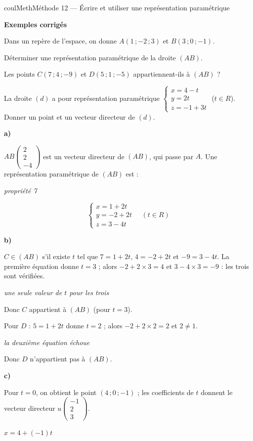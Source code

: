 \documentclass[11pt,a4paper]{article}
\makeatletter
\newcommand{\R}{\mathbb{R}}
\newcommand{\N}{\mathbb{N}}
\newcommand{\Z}{\mathbb{Z}}
\newcommand{\Q}{\mathbb{Q}}
\newcommand{\vect}[1]{\overrightarrow{#1}}
\newcommand{\fois}[1]{\times{\color{coulExo}#1}}
\providecommand{\Cf}{\mathcal{C}\sb{f}}%
\providecommand{\Cg}{\mathcal{C}\sb{g}}%
\newcounter{lycee@signet}
\newcommand{\signet}[3][]{\stepcounter{lycee@signet}%
  \edef\lycee@dest{\if\relax\detokenize{#1}\relax
    signet.\arabic{lycee@signet}\else#1\fi}%
  \hypertarget{\lycee@dest}{}\bookmark[level=#2,dest=\lycee@dest]{#3}}
\def\R{R}\def\N{N}\def\Z{Z}\def\Q{Q}\def\vect#1{#1}\def\Cf{Cf}\def\Cg{Cg}\def\fois#1{×#1}%
\newcommand{\res}[1]{#1}
\newcounter{methode}
\newenvironment{methodebox}[1][Méthode]{\stepcounter{methode}%
  \begin{boitecours}[phantom={\signet[methode-\arabic{methode}]{2}{#1}}]{coulMeth}{#1}}%
  {\end{boitecours}}
\newcommand{\etape}[1]{\par\smallskip\textbf{\color{coulMeth}#1}\par\nobreak\smallskip}
\newcommand{\explique}[2]{\par\smallskip\noindent
  \begin{minipage}[t]{0.57\linewidth}\raggedright #1\end{minipage}\hfill
  \begin{minipage}[t]{0.40\linewidth}\raggedright\leavevmode
    {\small\itshape\color{black!60}#2}\end{minipage}\par}
\newcommand{\cas}[1]{\par\smallskip\noindent\textbf{\color{coulExo}#1}\vadjust{\nobreak}}
\newenvironment{correction}{\par}{\par}
\newcommand{\etapeexemples}{\etape{Exemples corrigés}}
\makeatother
\begin{document}
\begin{methodebox}[Méthode 12 --- Écrire et utiliser une représentation paramétrique]
\etapeexemples
Dans un repère de l'espace, on donne $A(1\,;-2\,;3)$ et $B(3\,;0\,;-1)$.
\begin{questions}[label=\alph*)]
  \item Déterminer une représentation paramétrique de la droite $(AB)$.
  \item Les points $C(7\,;4\,;-9)$ et $D(5\,;1\,;-5)$ appartiennent-ils à $(AB)$ ?
  \item La droite $(d)$ a pour représentation paramétrique
        $\left\{\begin{array}{l} x=4-t\\ y=2t\\ z=-1+3t\end{array}\right.$ ($t\in\R$).
        Donner un point et un vecteur directeur de $(d)$.
\end{questions}
\begin{correction}
\cas{a)}
\explique{$\vect{AB}\begin{pmatrix}2\\2\\-4\end{pmatrix}$ est un vecteur directeur de $(AB)$, qui passe par $A$.
Une représentation paramétrique de $(AB)$ est :}{propriété 7}
\[
\res{\left\{\begin{array}{l} x=1+2t\\ y=-2+2t\\ z=3-4t\end{array}\right.\quad(t\in\R)}
\]
\cas{b)}
\explique{$C\in(AB)$ s'il existe $t$ tel que $7=1+2t$, $4=-2+2t$ et $-9=3-4t$. La
première équation donne $t=3$ ; alors $-2+2\times 3=4$ et $3-4\times 3=-9$ : les trois
sont vérifiées.}{une seule valeur de $t$ pour les trois}
\explique{Donc \res{$C$ appartient à $(AB)$} (pour $t=3$).}{}
\explique{Pour $D$ : $5=1+2t$ donne $t=2$ ; alors $-2+2\times 2=2$ et $2\neq 1$.}{la
deuxième équation échoue}
\explique{Donc \res{$D$ n'appartient pas à $(AB)$}.}{}
\cas{c)}
\explique{Pour $t=0$, on obtient le point \res{$(4\,;0\,;-1)$} ; les coefficients de $t$
donnent le vecteur directeur \res{$\vect{u}\begin{pmatrix}-1\\2\\3\end{pmatrix}$}.}{$x=4+(-1)t$}
\end{correction}


\end{methodebox}
\end{document}
